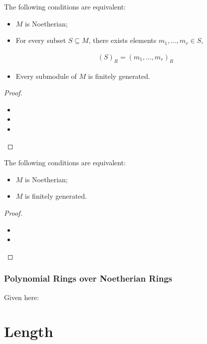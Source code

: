 \documentclass[Total.tex]{subfiles}
\begin{document}
		\begin{proposition}
			The following conditions are equivalent:
			
			\begin{itemize}
				\item $M$ is Noetherian;
				\item For every subset $S\subseteq M$, there exists elements $m_1,\dots,m_r\in S$,
				
				\begin{gather*}
					(S)_R=(m_1,\dots,m_r)_R
				\end{gather*}
				\item Every submodule of $M$ is finitely generated.
			\end{itemize}
		\end{proposition}
		
		\begin{proof}
			\begin{itemize}
				\item 
				\item 
				\item 
			\end{itemize}
		\end{proof}
		
		\begin{proposition}
			The following conditions are equivalent:
			
			\begin{itemize}
				\item $M$ is Noetherian;
				\item $M$ is finitely generated.
			\end{itemize}
		\end{proposition}
		
		\begin{proof}
			\begin{itemize}
				\item 
				\item 
			\end{itemize}
		\end{proof}
		
		\subsubsection{Polynomial Rings over Noetherian Rings}
		
		Given here:
		
		\section{Length}
		
\end{document}
